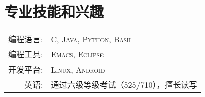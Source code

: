 \documentclass[a4paper,10pt]{article} %
\begin{document}

\section{专业技能和兴趣}

\begin{tabular}{rl}
编程语言: & \textsc{C}, \textsc{Java}, \textsc{Python}, \textsc{Bash}\\
编程工具: & \textsc{Emacs}, \textsc{Eclipse}\\
开发平台: & \textsc{Linux}, \textsc{Android}\\
英语: & 通过六级等级考试（525/710），擅长读写
\end{tabular}










\end{document}
